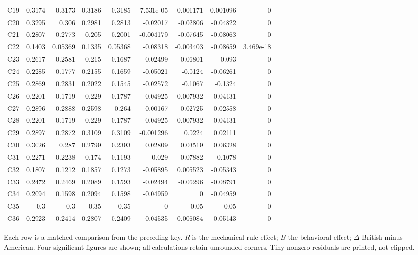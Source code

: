 \documentclass[10pt]{article}
\begin{document}
\begin{longtable}{@{}lrrrrrrrr@{}}
C19 & 0.3174 & 0.3173 & 0.3186 & 0.3185 & -7.531e-05 & 0.001171 & 0.001096 & 0\\[1pt]
C20 & 0.3295 & 0.306 & 0.2981 & 0.2813 & -0.02017 & -0.02806 & -0.04822 & 0\\[1pt]
C21 & 0.2807 & 0.2773 & 0.205 & 0.2001 & -0.004179 & -0.07645 & -0.08063 & 0\\[1pt]
C22 & 0.1403 & 0.05369 & 0.1335 & 0.05368 & -0.08318 & -0.003403 & -0.08659 & 3.469e-18\\[1pt]
C23 & 0.2617 & 0.2581 & 0.215 & 0.1687 & -0.02499 & -0.06801 & -0.093 & 0\\[1pt]
C24 & 0.2285 & 0.1777 & 0.2155 & 0.1659 & -0.05021 & -0.0124 & -0.06261 & 0\\[1pt]
C25 & 0.2869 & 0.2831 & 0.2022 & 0.1545 & -0.02572 & -0.1067 & -0.1324 & 0\\[1pt]
C26 & 0.2201 & 0.1719 & 0.229 & 0.1787 & -0.04925 & 0.007932 & -0.04131 & 0\\[1pt]
C27 & 0.2896 & 0.2888 & 0.2598 & 0.264 & 0.00167 & -0.02725 & -0.02558 & 0\\[1pt]
C28 & 0.2201 & 0.1719 & 0.229 & 0.1787 & -0.04925 & 0.007932 & -0.04131 & 0\\[1pt]
C29 & 0.2897 & 0.2872 & 0.3109 & 0.3109 & -0.001296 & 0.0224 & 0.02111 & 0\\[1pt]
C30 & 0.3026 & 0.287 & 0.2799 & 0.2393 & -0.02809 & -0.03519 & -0.06328 & 0\\[1pt]
C31 & 0.2271 & 0.2238 & 0.174 & 0.1193 & -0.029 & -0.07882 & -0.1078 & 0\\[1pt]
C32 & 0.1807 & 0.1212 & 0.1857 & 0.1273 & -0.05895 & 0.005523 & -0.05343 & 0\\[1pt]
C33 & 0.2472 & 0.2469 & 0.2089 & 0.1593 & -0.02494 & -0.06296 & -0.08791 & 0\\[1pt]
C34 & 0.2094 & 0.1598 & 0.2094 & 0.1598 & -0.04959 & 0 & -0.04959 & 0\\[1pt]
C35 & 0.3 & 0.3 & 0.35 & 0.35 & 0 & 0.05 & 0.05 & 0\\[1pt]
C36 & 0.2923 & 0.2414 & 0.2807 & 0.2409 & -0.04535 & -0.006084 & -0.05143 & 0\\[1pt]
\end{longtable}\normalsize
{}\par\medskip
Each row is a matched comparison from the preceding key. $R$ is the mechanical rule effect; $B$ the behavioral effect; $\Delta$ British minus American. Four significant figures are shown; all calculations retain unrounded corners. Tiny nonzero residuals are printed, not clipped.\par\medskip
\end{document}
